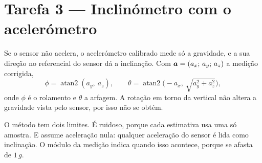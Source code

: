 \section{Tarefa 3 --- Inclinómetro com o acelerómetro}
\label{sec:incl}

Se o sensor não acelera, o acelerómetro calibrado mede só a gravidade, e a
sua direção no referencial do sensor dá a inclinação. Com
$\boldsymbol{a} = (a_x;\,a_y;\,a_z)$ a medição corrigida,
\begin{equation}
\phi = \operatorname{atan2}(a_y,\ a_z), \qquad
\theta = \operatorname{atan2}\!\bigl(-a_x,\ \sqrt{a_y^2 + a_z^2}\bigr),
\label{eq:incl}
\end{equation}
onde $\phi$ é o rolamento e $\theta$ a arfagem. A rotação em torno da
vertical não altera a gravidade vista pelo sensor, por isso não se obtém.

O método tem dois limites. É ruidoso, porque cada estimativa usa uma só
amostra. E assume aceleração nula: qualquer aceleração do sensor é lida como
inclinação. O módulo da medição indica quando isso acontece, porque se afasta
de $1\,g$.

